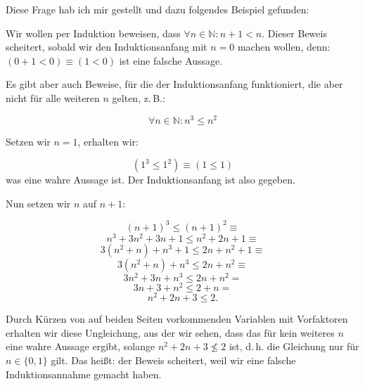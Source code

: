 \documentclass{scrartcl}
\begin{document}
Diese Frage hab ich mir gestellt und dazu folgendes Beispiel gefunden:

Wir wollen per Induktion beweisen, dass $\forall n \in \mathbb{N}: n + 1 < n$.
Dieser Beweis scheitert, sobald wir den Induktionsanfang mit $n = 0$ machen wollen, denn:
$(0 + 1 < 0) \equiv (1 < 0)$ ist eine falsche Aussage.

Es gibt aber auch Beweise, für die der Induktionsanfang funktioniert, die aber nicht
für alle weiteren $n$ gelten, z.\,B.:

\begin{equation}
	\forall n \in \mathbb{N}: n^3 \leq n^2
\end{equation}

Setzen wir $n = 1$, erhalten wir:

\begin{equation}
	(1^3 \leq 1^2) \equiv (1 \leq 1)
\end{equation}
was eine wahre Aussage ist. Der Induktionsanfang ist also gegeben.

Nun setzen wir $n$ auf $n + 1$:

\begin{equation}
	(n + 1)^3 \leq (n + 1)^2 \equiv
\end{equation}
\begin{equation*}
	n^3 + 3n^2 + 3n + 1 \leq n^2 + 2n + 1 \equiv
\end{equation*}
\begin{equation*}
	3 (n^2 + n) + n^3 + 1 \leq 2n + n^2 + 1 \equiv
\end{equation*}
\begin{equation*}
	3 (n^2 + n) + n^3 \leq 2n + n^2 \equiv
\end{equation*}
\begin{equation*}
	3n^2 + 3n + n^3 \leq 2n + n^2 =
\end{equation*}
\begin{equation*}
	3n + 3 + n^2 \leq 2 + n =
\end{equation*}
\begin{equation*}
	n^2 + 2n + 3 \leq 2.
\end{equation*}

Durch Kürzen von auf beiden Seiten vorkommenden Variablen mit Vorfaktoren erhalten wir diese
Ungleichung, aus der wir sehen, dass das für kein weiteres $n$ eine wahre Aussage ergibt, solange
$n^2 + 2n + 3 \not\leq 2$ ist, d.\,h. die Gleichung nur für $n \in \{0, 1\}$ gilt.
Das heißt: der Beweis scheitert, weil wir eine falsche Induktionsannahme gemacht haben.
\end{document}
